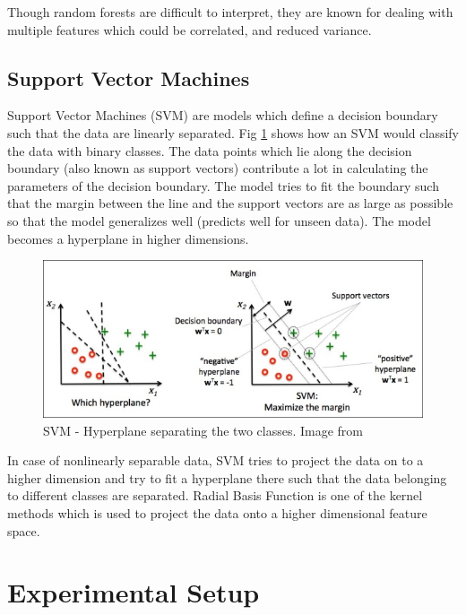     Though random forests are difficult to interpret, they are known for dealing with multiple features which could be correlated, and reduced variance. 
    
    
    \subsection{Support Vector Machines}    
    
    Support Vector Machines (SVM) are models which define a decision boundary such that the data are linearly separated. Fig \ref{svm_graph} shows how an SVM would classify the data with binary classes. The data points which lie along the decision boundary (also known as support vectors) contribute a lot in calculating the parameters of the decision boundary. The model tries to fit the boundary such that the margin between the line and the support vectors are as large as possible so that the model generalizes well (predicts well for unseen data). The model becomes a hyperplane in higher dimensions. 
    
    \begin{figure}[h]
    	\centering
    	\includegraphics[scale=1.2]{images/svm_graph}
    	\caption{SVM - Hyperplane separating the two classes. Image from \cite{raschka2015python}}
    	\label{svm_graph}
    \end{figure}
    
    In case of nonlinearly separable data, SVM tries to project the data on to a higher dimension and try to fit a hyperplane there such that the data belonging to different classes are separated. Radial Basis Function is one of the kernel methods which is used to project the data onto a higher dimensional feature space. 
    
    \vspace{3mm}
    \section{Experimental Setup}
    
